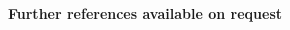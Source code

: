 \documentclass[10pt,a4paper,withhyper]{altacv}
\begin{document}
\begin{paracol}{2}
\divider

\vspace{-0.5em}

\textbf{Further references available on request}



\end{paracol}





\end{document}
